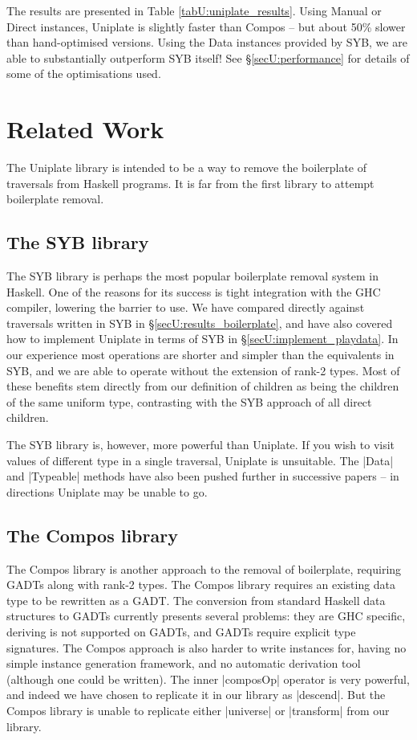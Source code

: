 The results are presented in Table \ref{tabU:uniplate_results}. Using Manual or Direct instances, Uniplate is slightly faster than Compos -- but about 50\% slower than hand-optimised versions. Using the Data instances provided by SYB, we are able to substantially outperform SYB itself! See \S\ref{secU:performance} for details of some of the optimisations used.


\section{Related Work}
\label{secU:related}

The Uniplate library is intended to be a way to remove the boilerplate of traversals from Haskell programs. It is far from the first library to attempt boilerplate removal.

\subsection{The SYB library}

The SYB library \citep{lammel:syb} is perhaps the most popular boilerplate removal system in Haskell. One of the reasons for its success is tight integration with the GHC compiler, lowering the barrier to use. We have compared directly against traversals written in SYB in \S\ref{secU:results_boilerplate}, and have also covered how to implement Uniplate in terms of SYB in \S\ref{secU:implement_playdata}. In our experience most operations are shorter and simpler than the equivalents in SYB, and we are able to operate without the extension of rank-2 types. Most of these benefits stem directly from our definition of children as being the children of the same uniform type, contrasting with the SYB approach of all direct children.

The SYB library is, however, more powerful than Uniplate. If you wish to visit values of different type in a single traversal, Uniplate is unsuitable. The |Data| and |Typeable| methods have also been pushed further in successive papers \citep{lammel:syb2,lammel:syb3} -- in directions Uniplate may be unable to go.

\subsection{The Compos library}

The Compos library \citep{bringert:compos} is another approach to the removal of boilerplate, requiring GADTs \citep{spj:gadt} along with rank-2 types. The Compos library requires an existing data type to be rewritten as a GADT. The conversion from standard Haskell data structures to GADTs currently presents several problems: they are GHC specific, deriving is not supported on GADTs, and GADTs require explicit type signatures. The Compos approach is also harder to write instances for, having no simple instance generation framework, and no automatic derivation tool (although one could be written). The inner |composOp| operator is very powerful, and indeed we have chosen to replicate it in our library as |descend|. But the Compos library is unable to replicate either |universe| or |transform| from our library.

